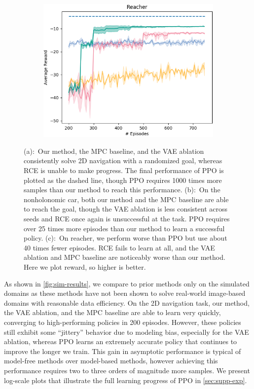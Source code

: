 \begin{figure}
\begin{subfigure}{0.33\linewidth}
        \includegraphics[width=\linewidth]{img/solar/reacher-lin.png}
        \caption{}
    \end{subfigure}
    \caption{(a):~Our method, the MPC baseline, and the VAE ablation consistently solve 2D navigation with a randomized goal, whereas RCE is unable to make progress. The final performance of PPO is plotted as the dashed line, though PPO requires 1000 times more samples than our method to reach this performance. (b):~On the nonholonomic car, both our method and the MPC baseline are able to reach the goal, though the VAE ablation is less consistent across seeds and RCE once again is unsuccessful at the task. PPO requires over 25 times more episodes than our method to learn a successful policy. (c):~On reacher, we perform worse than PPO but use about 40 times fewer episodes. RCE fails to learn at all, and the VAE ablation and MPC baseline are noticeably worse than our method. Here we plot reward, so higher is better.}
    \label{fig:sim-results}
    \vspace{-.5em}
\end{figure}

As shown in \autoref{fig:sim-results}, we compare to prior methods only on the simulated domains as these methods have not been shown to solve real-world image-based domains with reasonable data efficiency. On the 2D navigation task, our method, the VAE ablation, and the MPC baseline are able to learn very quickly, converging to high-performing policies in 200 episodes. However, these policies still exhibit some ``jittery'' behavior due to modeling bias, especially for the VAE ablation, whereas PPO learns an extremely accurate policy that continues to improve the longer we train. This gain in asymptotic performance is typical of model-free methods over model-based methods, however achieving this performance requires two to three orders of magnitude more samples. We present log-scale plots that illustrate the full learning progress of PPO in \autoref{sec:supp-exp}.

